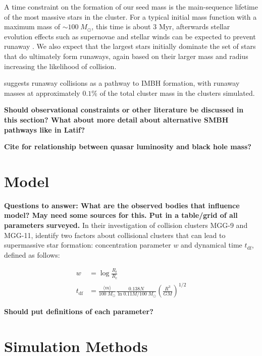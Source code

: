 \documentclass[preprint1]{aastex}
\newcommand\Msun{\; M_\odot}
\newcommand\Myr{\mbox{ Myr}}
\numberwithin{equation}{section}
\begin{document}
A time constraint on the formation of our seed mass is the main-sequence lifetime of the most massive stars in the cluster. For a typical initial mass function with a maximum mass of $\sim100 \Msun$, this time is about $3 \Myr$, afterwards stellar evolution effects such as supernovae and stellar winds can be expected to prevent runaway \citep{2002SPZ, 2016Latif}.  We also expect that the largest stars initially dominate the set of stars that do ultimately form runaways, again based on their larger mass and radius increasing the likelihood of collision.

\citet{2002SPZ} suggests runaway collisions as a pathway to \ac{IMBH} formation, with runaway masses at approximately $0.1\%$ of the total cluster mass in the clusters simulated.  \citet{2004SPZ} 

\textbf{Should observational constraints or other literature be discussed in this section?  What about more detail about alternative \ac{SMBH} pathways like in Latif?}

\textbf{Cite for relationship between quasar luminosity and black hole mass?}

\section{Model} \label{Model}
\textbf{Questions to answer:
What are the observed bodies that influence model?  May need some sources for this.
Put in a table/grid of all parameters surveyed.}
In their investigation of collision clusters MGG-9 and MGG-11, \citet{2004SPZ} identify two factors about collisional clusters that can lead to supermassive star formation: concentration parameter $w$ and dynamical time $t_{\mathrm{df}}$, defined as follows:

\begin{subequations}
    \begin{align}
    w &= \log{\frac{R_t}{R_c}} \\
    t_{\mathrm{df}} &= \frac{\langle m \rangle}{100 \Msun} \frac{0.138N}{\ln{0.11M/100\Msun}}\left(\frac{R^3}{GM}\right)^{1/2}
    \end{align}
    \label{eqn:tdf}
\end{subequations} 

\textbf{Should put definitions of each parameter?}

\textbf{}


\section{Simulation Methods} \label{Methods}
\end{document}
